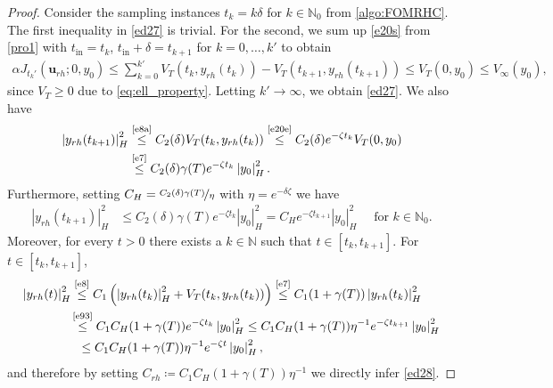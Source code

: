 \documentclass{m2an}
\newcommand{\N}{\mathbb N}
\newcommand{\bu}{\mathbf{u}}
\newcommand{\tint}{t_{\mathrm{in}}}
\newcommand{\norm}[2]{\left|#1\right|_{#2}}
\begin{document}
\begin{proof}
    Consider the sampling instances $t_k=k\delta$ for $k\in \N_0$ from \cref{algo:FOMRHC}. The first inequality in \eqref{ed27} is trivial. For the second, we sum up \eqref{e20s} from \cref{pro1} with $\tint = t_k$, $\tint+\delta = t_{k+1}$ for $k=0,\ldots,k'$ to obtain
    \begin{equation}
    \nonumber
        \begin{aligned}
            \alpha J_{t_k'}(\bu_{rh};0,y_0)\leq  \sum\limits_{k=0}^{k'}V_T(t_k,y_{rh}(t_k))-V_T(t_{k+1},y_{rh}(t_{k+1}))\leq V_T(0,y_0)\leq V_\infty(y_0),
        \end{aligned}
    \end{equation}
    since $V_T\geq 0$ due to \eqref{eq:ell_property}. Letting $k'\to\infty$, we obtain \eqref{ed27}.
    We also have 
    \begin{equation}
        \nonumber %
        \begin{aligned}
            \norm{y_{rh}(t_{k+1})}{H}^2 &\stackrel{\text{\eqref{e8a}}}{\leq} C_2(\delta) V_T( t_{k} , y_{rh}(t_{k}))\stackrel{\text{\eqref{e20e}}}{\leq} C_2(\delta) e^{-\zeta t_{k}}  V_T(0, y_0)\\
            &\stackrel{\text{\eqref{e7}}}{\leq} C_2(\delta) \gamma(T) e^{-\zeta t_{k}} \norm{y_0}{H}^2.
        \end{aligned}
    \end{equation}
    Furthermore, setting $C_H =\nicefrac{ C_2(\delta) \gamma(T)}{\eta}$ with $\eta = e^{-\delta \zeta}$ we have 
    \begin{equation}
        \label{e93}
        \begin{split}
        \norm{y_{rh}(t_{k+1})}{H}^2 &\leq C_2(\delta) \gamma(T) e^{-\zeta t_{k}}  \norm{y_0}{H}^2 =  C_He^{-\zeta t_{k+1}} \norm{y_0}{H}^2 \quad \text{ for }  k \in \N_0. 
        \end{split}
    \end{equation}
    Moreover, for every $t >0$ there exists a $k \in \mathbb{N}$ such that $t \in [t_k, t_{k+1}]$. For $t \in [t_k, t_{k+1}]$,
    \begin{equation}
        \label{eq:exp_cont_in_t}
        \begin{split}
            \norm{y_{rh}(t)}{H}^2 &\stackrel{\text{\eqref{e8}}}{\leq} C_1\left(\norm{y_{rh}(t_k)}{H}^2+V_T(t_{k},y_{rh}(t_{k}))\right)\stackrel{\text{\eqref{e7}}}{\leq}C_1(1+\gamma(T))\norm{y_{rh}(t_k)}{H}^2\\
            &\hspace{-0.5mm} \stackrel{\text{\eqref{e93}}}{\leq} C_1C_H(1+\gamma(T)) e^{-\zeta t_k} \norm{y_0}{H}^2\leq  C_1C_H(1+\gamma(T))\eta^{-1}e^{-\zeta t_{k+1}}\norm{y_0}{H}^2\\
            &\hspace{2mm}\leq  C_1C_H(1+\gamma(T))\eta^{-1}e^{-\zeta t}\norm{y_0}{H}^2,
        \end{split}
    \end{equation}
    and therefore by setting $C_{rh} \coloneqq C_1C_H(1+\gamma(T))\eta^{-1}$
    we directly infer \eqref{ed28}.
\end{proof}
\end{document}

